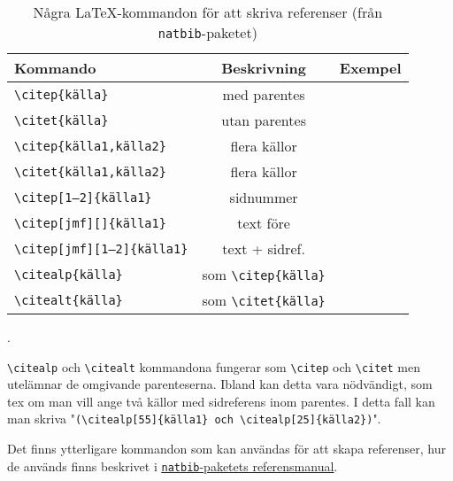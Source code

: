 \begin{table}[ht]
  \centering
  \renewcommand{\arraystretch}{1.25}%
  \begin{tabular}[t]{lcc}
    \toprule
    {\sffamily\textbf{Kommando}} &
    {\sffamily\textbf{Beskrivning}} &
    {\sffamily\textbf{Exempel}} \\
    \midrule
    \texttt{\textbackslash{}citep\{källa\}} &
    med parentes &
    \citep{bergman+wallin-2001} \\
    \texttt{\textbackslash{}citet\{källa\}} &
    utan parentes &
    \citet{bergman+wallin-2001} \\
    \midrule
    \texttt{\textbackslash{}citep\{källa1,källa2\}} &
    flera källor &
    \citep{bergman+wallin-2001,bergman-1977} \\
    \texttt{\textbackslash{}citet\{källa1,källa2\}} &
    flera källor &
    \citet{bergman+wallin-2001,bergman-1977} \\
    \midrule
    \texttt{\textbackslash{}citep[1--2]\{källa1\}} &
    sidnummer &
    \citep[1--2]{bergman-1977} \\
    \texttt{\textbackslash{}citep[jmf][]\{källa1\}} &
    text före &
    \citep[jmf][]{bergman-1977} \\
    \texttt{\textbackslash{}citep[jmf][1--2]\{källa1\}} &
    text + sidref. &
    \citep[jmf][1--2]{bergman-1977} \\
    \midrule
    \texttt{\textbackslash{}citealp\{källa\}} &
    som \texttt{\textbackslash{}citep\{källa\}} &
    \citealp{bergman+wallin-2001} \\
    \texttt{\textbackslash{}citealt\{källa\}} &
    som \texttt{\textbackslash{}citet\{källa\}} &
    \citealt{bergman+wallin-2001} \\
    \bottomrule
  \end{tabular}
  \caption{Några \LaTeX-kommandon för att skriva referenser (från
    \texttt{natbib}-paketet)}.
\end{table}

\texttt{\textbackslash{}citealp} och \texttt{\textbackslash{}citealt}
kommandona fungerar som \texttt{\textbackslash{}citep} och
\texttt{\textbackslash{}citet} men utelämnar de omgivande parenteserna. Ibland
kan detta vara nödvändigt, som tex om man vill ange två källor med sidreferens
inom parentes. I detta fall kan man skriva
"\texttt{(\textbackslash{}citealp[55]\{källa1\} och
  \textbackslash{}citealp[25]\{källa2\})}".

Det finns ytterligare kommandon som kan användas för att skapa referenser, hur
de används finns beskrivet i
\underline{\href{http://ftp.acc.umu.se/mirror/CTAN/macros/latex/contrib/natbib/natbib.pdf}{\texttt{natbib}-paketets referensmanual}}.

